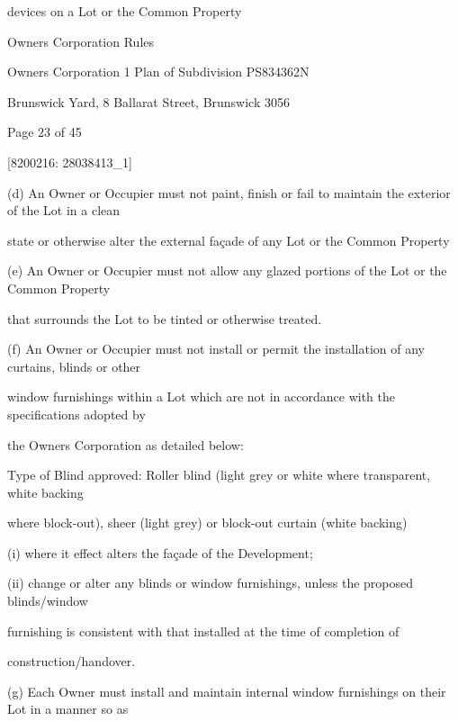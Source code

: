 \documentclass{article}
\begin{document}
{\fontsize{10.02}{1}devices on a Lot or the Common Property }

\newpage





{\fontsize{9}{1}Owners Corporation Rules }

{\fontsize{9}{1}Owners Corporation 1 Plan of Subdivision PS834362N }

{\fontsize{9}{1}Brunswick Yard, 8 Ballarat Street, Brunswick 3056 }


{\fontsize{9}{1}Page 23  of 45 }



{\fontsize{7.02}{1}[8200216: 28038413\_1] }

{\fontsize{9.962}{1}(d) An Owner or Occupier must not paint, finish or fail to maintain the exterior of the Lot in a clean }

{\fontsize{10.02}{1}state or otherwise alter the external façade of any Lot or the Common Property }

{\fontsize{9.962}{1}(e) An Owner or Occupier must not allow any glazed portions of the Lot or the Common Property }

{\fontsize{10.02}{1}that surrounds the Lot to be tinted or otherwise treated. }

{\fontsize{9.962}{1}(f) An Owner or Occupier must not install or permit the installation of any curtains, blinds or other }

{\fontsize{10.02}{1}window furnishings within a Lot which are not in accordance with the specifications adopted by }

{\fontsize{10.02}{1}the Owners Corporation as detailed below: }

{\fontsize{10.02}{1}Type of Blind approved: Roller blind (light grey or white where transparent, white backing }

{\fontsize{10.02}{1}where block-out), sheer (light grey) or block-out curtain (white backing)  }

{\fontsize{9.962}{1}(i) where it effect alters the façade of the Development; }

{\fontsize{9.962}{1}(ii) change or alter any blinds or window furnishings, unless the proposed blinds/window }

{\fontsize{10.02}{1}furnishing is consistent with that installed at the time of completion of }

{\fontsize{10.02}{1}construction/handover. }

{\fontsize{9.962}{1}(g) Each Owner must install and maintain internal window furnishings on their Lot in a manner so as }
\end{document}
